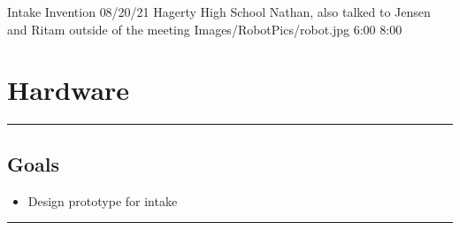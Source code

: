 \insertmeeting 
	{Intake Invention} 
	{08/20/21}
	{Hagerty High School}
	{Nathan, also talked to Jensen and Ritam outside of the meeting}
	{Images/RobotPics/robot.jpg}
	{6:00}
  {8:00}
	
\section*{Hardware}
\noindent\hfil\rule{\textwidth}{.4pt}\hfil
\subsection*{Goals}
\begin{itemize}
    \item Design prototype for intake

\end{itemize} 

\noindent\hfil\rule{\textwidth}{.4pt}\hfil

